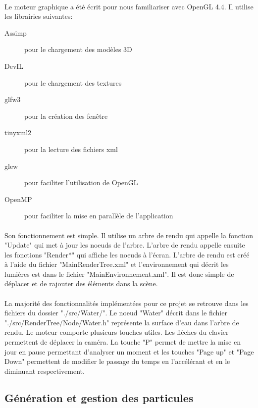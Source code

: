 \documentclass[a4paper, 12pt]{article} %
\begin{document}
	\paragraph{}
	Le moteur graphique a été écrit pour nous familiariser avec OpenGL 4.4. Il utilise les librairies suivantes:
	\begin{description}
		\item[Assimp] pour le chargement des modèles 3D
		\item[DevIL] pour le chargement des textures
		\item[glfw3] pour la création des fenêtre
		\item[tinyxml2] pour la lecture des fichiers xml
		\item[glew] pour faciliter l'utilisation de OpenGL
		\item[OpenMP] pour faciliter la mise en parallèle de l'application
	\end{description}
	
	\paragraph{}
	Son fonctionnement est simple. Il utilise un arbre de rendu qui appelle la fonction "Update" qui met à jour les noeuds de l'arbre.
	L'arbre de rendu appelle ensuite les fonctions "Render*" qui affiche les noeuds à l'écran. L'arbre de rendu est créé à l'aide du
	fichier "MainRenderTree.xml" et l'environnement qui décrit les lumières est dans le fichier "MainEnvironnement.xml". Il est donc
	simple de déplacer et de rajouter des éléments dans la scène.

	\paragraph{}
	La majorité des fonctionnalités implémentées pour ce projet se retrouve dans les fichiers du dossier "./src/Water/". Le noeud 
	"Water" décrit dans le fichier "./src/RenderTree/Node/Water.h" représente la surface d'eau dans l'arbre de rendu.
	Le moteur comporte plusieurs touches utiles. Les flèches du clavier permettent de déplacer la caméra. La touche "P" permet de mettre la mise en jour
	en pause permettant d'analyser un moment et les touches "Page up" et "Page Down" permettent de modifier le passage du temps en l'accélérant et en 
	le diminuant respectivement.

\subsection{Génération et gestion des particules}
\end{document}

